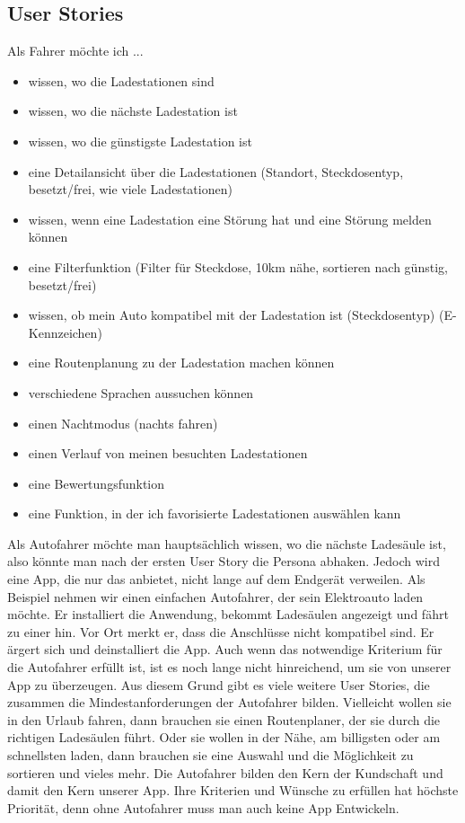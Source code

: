 \documentclass[utf8]{lni}
\begin{document}
\subsection{User Stories}

Als Fahrer möchte ich ...
 \begin{itemize}
	\item wissen, wo die Ladestationen sind
	\item wissen, wo die nächste Ladestation ist
	\item wissen, wo die günstigste Ladestation ist
	\item eine Detailansicht über die Ladestationen (Standort, Steckdosentyp, besetzt/frei, wie viele Ladestationen)
	\item wissen, wenn eine Ladestation eine Störung hat und eine Störung melden können
	\item eine Filterfunktion (Filter für Steckdose, 10km nähe, sortieren nach günstig, besetzt/frei)
	\item wissen, ob mein Auto kompatibel mit der Ladestation ist (Steckdosentyp) (E-Kennzeichen)
	\item eine Routenplanung zu der Ladestation machen können
	\item verschiedene Sprachen aussuchen können
	\item einen Nachtmodus (nachts fahren)
	\item einen Verlauf von meinen besuchten Ladestationen
	\item eine Bewertungsfunktion
	\item eine Funktion, in der ich favorisierte Ladestationen auswählen kann
\end{itemize}

Als Autofahrer möchte man hauptsächlich wissen, wo die nächste Ladesäule ist, also könnte man nach der ersten User Story die Persona abhaken. Jedoch wird eine App, die nur das anbietet, nicht lange auf dem Endgerät verweilen.
Als Beispiel nehmen wir einen einfachen Autofahrer, der sein Elektroauto laden möchte. Er installiert die Anwendung, bekommt Ladesäulen angezeigt und fährt zu einer hin. Vor Ort merkt er, dass die Anschlüsse nicht kompatibel sind. Er ärgert sich und deinstalliert die App. Auch wenn das notwendige Kriterium für die Autofahrer erfüllt ist, ist es noch lange nicht hinreichend, um sie von unserer App zu überzeugen. Aus diesem Grund gibt es viele weitere User Stories, die zusammen die Mindestanforderungen der Autofahrer bilden.
Vielleicht wollen sie in den Urlaub fahren, dann brauchen sie einen Routenplaner, der sie durch die richtigen Ladesäulen führt. Oder sie wollen in der Nähe, am billigsten oder am schnellsten laden, dann brauchen sie eine Auswahl und die Möglichkeit zu sortieren und vieles mehr.
Die Autofahrer bilden den Kern der Kundschaft und damit den Kern unserer App. Ihre Kriterien und Wünsche zu erfüllen hat höchste Priorität, denn ohne Autofahrer muss man auch keine App Entwickeln.
\end{document}
